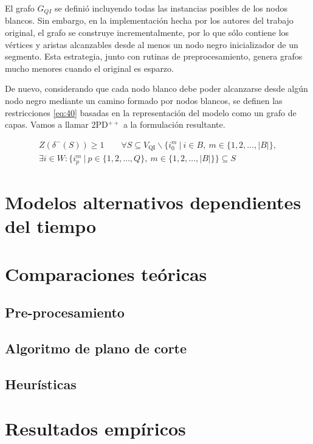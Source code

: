 \documentclass[10pt, a4paper]{article}
\theoremstyle{definition}
\begin{document}
El grafo $G_{QI}$ se definió incluyendo todas las instancias posibles de los nodos blancos. Sin embargo, en la implementación hecha por los autores del trabajo original, el grafo se construye incrementalmente, por lo que sólo contiene los vértices y aristas alcanzables desde al menos un nodo negro inicializador de un segmento. Esta estrategia, junto con rutinas de preprocesamiento, genera grafos mucho menores cuando el original es esparzo.

De nuevo, considerando que cada nodo blanco debe poder alcanzarse desde algún nodo negro mediante un camino formado por nodos blancos, se definen las restricciones \ref{eq:40} basadas en la representación del modelo como un grafo de capas. Vamos a llamar 2PD$^{++}$ a la formulación resultante.

\begin{multline}
	 Z(\delta^{-}(S)) \geq 1 \quad \quad \forall S \subseteq V_{\mathrm{QI}} \backslash\{i_{0}^{m}\ |\ i \in B,\ m \in\{1,2, \ldots,|B|\}, \\
	 \exists i \in W : \{i_{p}^{m}\ |\ p \in \{1,2, \ldots, Q\},\ m \in \{1,2, \ldots,|B|\}\} \subseteq S \label{eq:40}
\end{multline}

\section{Modelos alternativos dependientes del tiempo}

\section{Comparaciones teóricas}

\subsection{Pre-procesamiento}

\subsection{Algoritmo de plano de corte}

\subsection{Heurísticas}

\section{Resultados empíricos}
\end{document}
